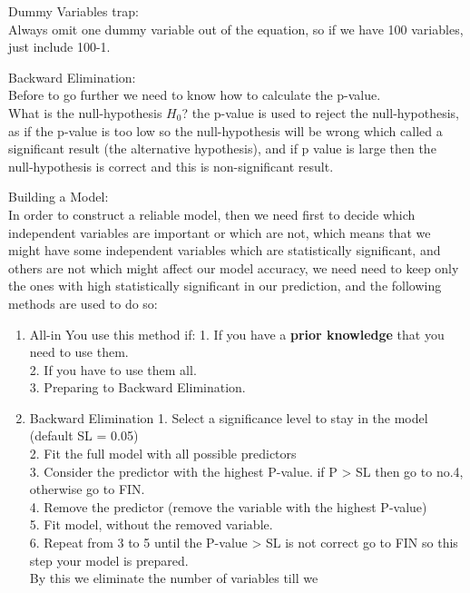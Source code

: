 \documentclass{article}
\begin{document}
\begin{itemize}
  Dummy Variables trap:\\
  Always omit one dummy variable out of the equation, so if we have 100 variables, just include 100-1.

  Backward Elimination:\\
  Before to go further we need to know how to calculate the p-value.\\
  What is the null-hypothesis \(H_0\)?
  the p-value is used to reject the null-hypothesis, as if the p-value is too low so the null-hypothesis will be wrong which called a significant result (the alternative hypothesis), and if p value is large then the null-hypothesis is correct and this is non-significant result.

  Building a Model:\\
    In order to construct a reliable model, then we need first to decide which independent variables are important or which are not, which means that we might have some independent variables which are statistically significant, and others are not which might affect our model accuracy, we need need to keep only the ones with high statistically significant in our prediction, and the following methods are used to do so:
    \begin{enumerate}
      \item All-in
      You use this method if:  
      1. If you have a \textbf{prior knowledge} that you need to use them.\\
      2. If you have to use them all.\\
      3. Preparing to Backward Elimination.\\

      \item Backward Elimination
        1. Select a significance level to stay in the model (default SL = 0.05)\\
        2. Fit the full model with all possible predictors\\
        3. Consider the predictor with the highest P-value. if P > SL then go to no.4, otherwise go to FIN.\\
        4. Remove the predictor (remove the variable with the highest P-value)\\
        5. Fit model, without the removed variable.\\
        6. Repeat from 3 to 5 until the P-value > SL is not correct go to FIN so this step your model is prepared.\\

        By this we eliminate the number of variables till we 


\end{enumerate}
\end{itemize}
\end{document}
